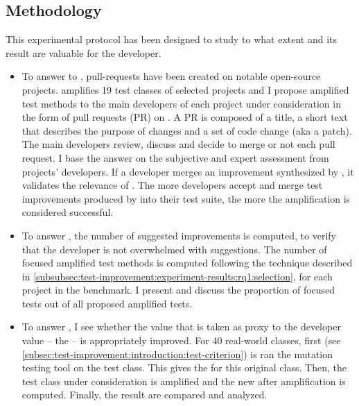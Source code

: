 \subsection{Methodology}
\label{subsec:test-improvement:experiment-protocol:methodology}

This experimental protocol has been designed to study to what extent \dspot and its result are valuable for the developer.

\begin{itemize}
	\item \textbf{\rqpullrequest}
	To answer to \rqpullrequest, pull-requests have been created on notable open-source projects.
	\dspot amplifies 19 test classes of selected projects and I propose amplified test methods to the main developers of each project under consideration in the form of pull requests (PR) on \gh.
	A PR is composed of a title, a short text that describes the purpose of changes and a set of code change (aka a patch).
	The main developers review, discuss and decide to merge or not each pull request.
	I base the answer on the subjective and expert assessment from projects' developers.
	If a developer merges an improvement synthesized by \dspot, it validates the relevance of \dspot.
	The more developers accept and merge test improvements produced by \dspot into their test suite, the more the amplification is considered successful.
	
	\item \textbf{\rqcandidates}
	To answer \rqcandidates, the number of suggested improvements is computed, to verify that the developer is not overwhelmed with suggestions.
	The number of focused amplified test methods is computed following the technique described in \autoref{subsubsec:test-improvement:experiment-results:rq1:selection}, for each project in the benchmark.
	I present and discuss the proportion of focused tests out of all proposed amplified tests.
	
	\item \textbf{\rqeffectiveness}
	To answer \rqeffectiveness, I see whether the value that is taken as proxy to the developer value -- the \ms -- is appropriately improved.
	For 40 real-world classes, first \pitest (see \autoref{subsec:test-improvement:introduction:test-criterion}) is ran the mutation testing tool on the test class. 
	This gives the \ams for this original class. 
	Then, the test class under consideration is amplified and the new \ams after amplification is computed. 
	Finally, the result are compared and analyzed.
	

\end{itemize}
